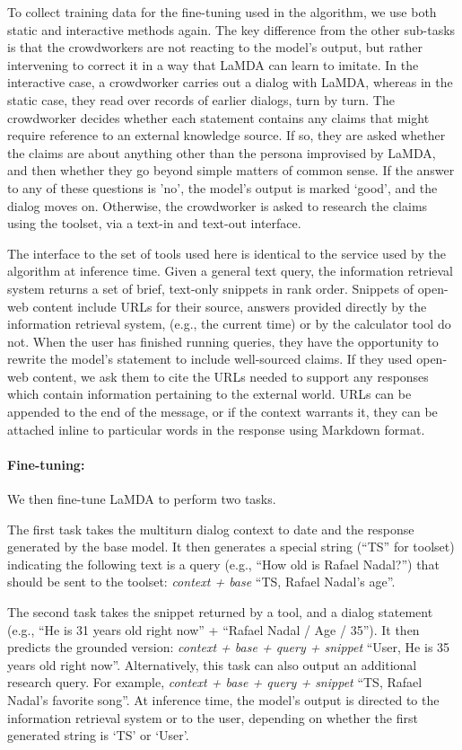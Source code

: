 \documentclass{article}
\def\knowledgetool{information retrieval system\xspace}
\def\knowledgetoolshort{TS\xspace}
\begin{document}
To collect training data for the fine-tuning used in the algorithm, we use both static and interactive methods again. The key difference from the other sub-tasks is that the crowdworkers are not reacting to the model’s output, but rather intervening to correct it in a way that LaMDA can learn to imitate. In the interactive case, a crowdworker carries out a dialog with LaMDA, whereas in the static case, they read over records of earlier dialogs, turn by turn. The crowdworker decides whether each statement contains any claims that might require reference to an external knowledge source. If so, they are asked whether the claims are about anything other than the persona improvised by LaMDA, and then whether they go beyond simple matters of common sense. If the answer to any of these questions is ’no’, the model’s output is marked ‘good’, and the dialog moves on. Otherwise, the crowdworker is asked to research the claims using the toolset, via a text-in and text-out interface.

The interface to the set of tools used here is identical to the service used by the algorithm at inference time. Given a general text query, the \knowledgetool returns a set of brief, text-only snippets in rank order. Snippets of open-web content include URLs for their source, answers provided directly by the \knowledgetool, (e.g., the current time) or by the calculator tool do not. When the user has finished running queries, they have the opportunity to rewrite the model's statement to include well-sourced claims. If they used open-web content, we ask them to cite the URLs  needed to support any responses which contain information pertaining to the external world. URLs can be appended to the end of the message, or if the context warrants it, they can be attached inline to particular words in the response using Markdown format.

\paragraph{Fine-tuning:}We then fine-tune LaMDA to perform two tasks.

The first task takes the multiturn dialog context to date and the response generated by the base model. It then generates a special string (``\knowledgetoolshort'' for toolset) indicating the following text is a query (e.g., ``How old is Rafael Nadal?'') that should be sent to the toolset: \emph{context + base}  ``\knowledgetoolshort, Rafael Nadal's age''.

The second task takes the snippet returned by a tool, and a dialog statement (e.g., ``He is 31 years old right now'' + ``Rafael Nadal / Age / 35''). It then predicts the grounded version: \emph{context + base + query + snippet}  ``User, He is 35 years old right now''. Alternatively, this task can also output an additional research query. For example, \emph{context + base + query + snippet}  ``\knowledgetoolshort, Rafael Nadal's favorite song''. 
At inference time, the model's output is directed to the \knowledgetool or to the user, depending on whether the first generated string is `\knowledgetoolshort' or `User'.
\end{document}
